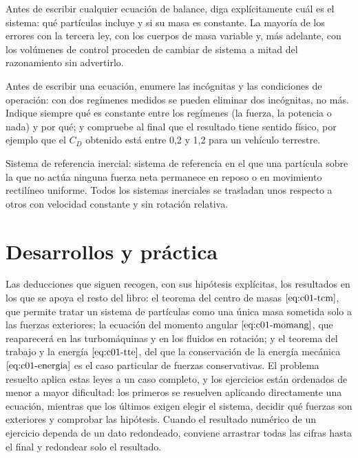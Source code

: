 \documentclass[10pt,openany]{book}
\begin{document}
\begin{tcolorbox}[title={Consejo}, studiumtip, breakable]

Antes de escribir cualquier ecuación de balance, diga explícitamente cuál es el sistema: qué partículas incluye y si su masa es constante. La mayoría de los errores con la tercera ley, con los cuerpos de masa variable y, más adelante, con los volúmenes de control proceden de cambiar de sistema a mitad del razonamiento sin advertirlo.

Antes de escribir una ecuación, enumere las incógnitas y las condiciones de operación: con dos regímenes medidos se pueden eliminar dos incógnitas, no más. Indique siempre qué es constante entre los regímenes (la fuerza, la potencia o nada) y por qué; y compruebe al final que el resultado tiene sentido físico, por ejemplo que el \(C_D\) obtenido está entre 0,2 y 1,2 para un vehículo terrestre.
\end{tcolorbox}

\begin{tcolorbox}[title={Definición}, studiumdef, breakable]

Sistema de referencia inercial: sistema de referencia en el que una partícula sobre la que no actúa ninguna fuerza neta permanece en reposo o en movimiento rectilíneo uniforme. Todos los sistemas inerciales se trasladan unos respecto a otros con velocidad constante y sin rotación relativa.
\end{tcolorbox}



\section{Desarrollos y práctica}

Las deducciones que siguen recogen, con sus hipótesis explícitas, los resultados en los que se apoya el resto del libro: el teorema del centro de masas \(\eqref{eq:c01-tcm}\), que permite tratar un sistema de partículas como una única masa sometida solo a las fuerzas exteriores; la ecuación del momento angular \(\eqref{eq:c01-momang}\), que reaparecerá en las turbomáquinas y en los fluidos en rotación; y el teorema del trabajo y la energía \(\eqref{eq:c01-tte}\), del que la conservación de la energía mecánica \(\eqref{eq:c01-energia}\) es el caso particular de fuerzas conservativas. El problema resuelto aplica estas leyes a un caso completo, y los ejercicios están ordenados de menor a mayor dificultad: los primeros se resuelven aplicando directamente una ecuación, mientras que los últimos exigen elegir el sistema, decidir qué fuerzas son exteriores y comprobar las hipótesis. Cuando el resultado numérico de un ejercicio dependa de un dato redondeado, conviene arrastrar todas las cifras hasta el final y redondear solo el resultado.
\end{document}
